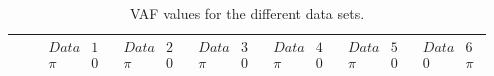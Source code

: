 \documentclass[main.tex]{subfiles}
\begin{document}
\begin{table}[h]
\centering
\caption{VAF values for the different data sets.}
\label{tab:VAFl}
\begin{tabular}{|l|l|l|l|l|l|l|l|}
\hline
                &                                                  & $\begin{matrix}Data  & 1 \\\pi & 0 \end{matrix}$                                       & $\begin{matrix}Data & 2 \\\pi & 0 \\ \end{matrix}$                                      & $\begin{matrix}Data & 3 \\\pi & 0 \\ \end{matrix}$                                      & $\begin{matrix}Data & 4 \\\pi & 0 \\ \end{matrix}$                                     & $\begin{matrix}Data & 5\\\pi & 0 \\ \end{matrix}$                                       & $\begin{matrix}Data &6\\0 & \pi \\ \end{matrix}$                                      \\ \hline

\end{tabular}
\end{table}
\end{document}

